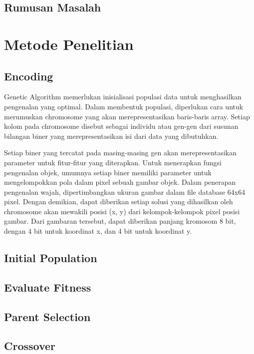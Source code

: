 \documentclass[conference]{IEEEtran}
\begin{document}
\subsection{Rumusan Masalah}


\section{Metode Penelitian}
\subsection{Encoding}
Genetic Algorithm memerlukan inisialisasi populasi data untuk menghasilkan pengenalan yang optimal. Dalam membentuk populasi, diperlukan cara untuk merumuskan chromosome yang akan merepresentasikan baris-baris array. Setiap kolom pada chromosome disebut sebagai individu atau gen-gen dari susunan bilangan biner yang merepresentasikan isi dari data yang dibutuhkan. 

Setiap biner yang tercatat pada masing-masing gen akan merepresentasikan parameter untuk fitur-fitur yang diterapkan. Untuk menerapkan fungsi pengenalan objek, umumnya setiap biner memiliki parameter untuk mengelompokkan pola dalam pixel sebuah gambar objek. Dalam penerapan pengenalan wajah, dipertimbangkan ukuran gambar dalam file database 64x64 pixel. Dengan demikian, dapat diberikan setiap solusi yang dihasilkan oleh chromosome akan mewakili posisi (x, y) dari kelompok-kelompok pixel posisi gambar. Dari gambaran tersebut, dapat diberikan panjang kromosom 8 bit, dengan 4 bit untuk koordinat x, dan 4 bit untuk koordinat y.

\subsection{Initial Population}

\subsection{Evaluate Fitness}

\subsection{Parent Selection}

\subsection{Crossover}
\end{document}
